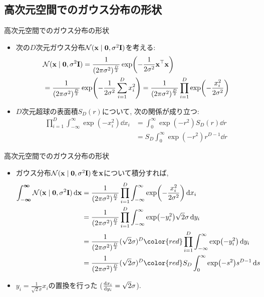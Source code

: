 \documentclass[dvipdfmx,notheorems,t]{beamer}
\begin{document}
\subsection{高次元空間でのガウス分布の形状}

\begin{frame}{高次元空間でのガウス分布の形状}
\begin{itemize}
  \item 次の$D$次元ガウス分布$\mathcal{N}(\vb{x} \mid \vb{0}, \sigma^2 \vb{I})$を考える:
  \begin{align*}
    & \mathcal{N}(\vb{x} \mid \vb{0}, \sigma^2 \vb{I})
      = \frac{1}{(2\pi \sigma^2)^\frac{D}{2}}
        \exp(-\frac{1}{2 \sigma^2} \vb{x}^\top \vb{x}) \\
      &= \frac{1}{(2\pi \sigma^2)^\frac{D}{2}}
        \exp(-\frac{1}{2 \sigma^2} \sum_{i = 1}^D x_i^2)
      = \frac{1}{(2\pi \sigma^2)^\frac{D}{2}}
        \prod_{i = 1}^D \exp(-\frac{x_i^2}{2 \sigma^2})
  \end{align*}

  \item $D$次元超球の表面積$S_D(r)$について, 次の関係が成り立つ:
  \begin{align*}
    \prod_{i = 1}^D \int_{-\infty}^\infty \exp(-x_i^2) \dd{x_i}
      &= \int_0^\infty \exp(-r^2) S_D(r) \dd{r} \\
      &= S_D \int_0^\infty \exp(-r^2) r^{D - 1} \dd{r}
  \end{align*}
\end{itemize}
\end{frame}

\begin{frame}{高次元空間でのガウス分布の形状}
\begin{itemize}
  \item ガウス分布$\mathcal{N}(\vb{x} \mid \vb{0}, \sigma^2 \vb{I})$を$\vb{x}$について積分すれば,
  \begin{align*}
    \int_{-\boldsymbol{\infty}}^{\boldsymbol{\infty}} \mathcal{N}(\vb{x} \mid \vb{0}, \sigma^2 \vb{I}) \dd{\vb{x}}
      &= \frac{1}{(2\pi \sigma^2)^\frac{D}{2}}
        \prod_{i = 1}^D \int_{-\infty}^\infty \exp(-\frac{x_i^2}{2 \sigma^2}) \dd{x_i} \\
      &= \frac{1}{(2\pi \sigma^2)^\frac{D}{2}}
        \prod_{i = 1}^D \int_{-\infty}^\infty \exp(-y_i^2) \sqrt{2} \sigma \dd{y_i} \\
      &= \frac{1}{(2\pi \sigma^2)^\frac{D}{2}} (\sqrt{2} \sigma)^D
        {\color{red} \prod_{i = 1}^D \int_{-\infty}^\infty \exp(-y_i^2) \dd{y_i}} \\
      &= \frac{1}{(2\pi \sigma^2)^\frac{D}{2}} (\sqrt{2} \sigma)^D
        {\color{red} S_D \int_0^\infty \exp(-s^2) s^{D - 1} \dd{s}}
  \end{align*}
  \item $y_i = \frac{1}{\sqrt{2} \sigma} x_i$の置換を行った ($\dv{x_i}{y_i} = \sqrt{2} \sigma$).
\end{itemize}
\end{frame}
\end{document}
